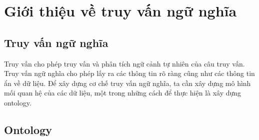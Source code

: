 

\section{Giới thiệu về truy vấn ngữ nghĩa}
\subsection{Truy vấn ngữ nghĩa}
Truy vấn cho phép truy vấn và phân tích ngữ cảnh tự nhiên của câu truy vấn. Truy vấn ngữ nghĩa cho phép lấy ra các thông tin rõ ràng cũng như các thông tin ẩn về dữ liệu. Để xây dựng cơ chế truy vấn ngữ nghĩa, ta cần xây dựng mô hình mối quan hệ của các dữ liệu, một trong những cách để thực hiện là xây dựng ontology.

\subsection{Ontology}
